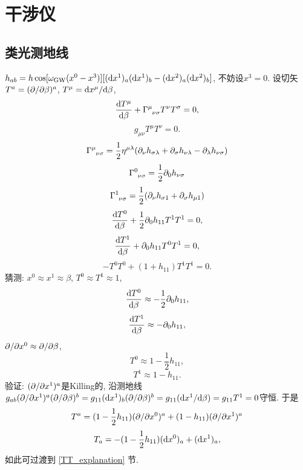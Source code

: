 \chapter{干涉仪}

\section{类光测地线}

$h_{ab}=h\cos[\omega_\text{GW}(x^0-x^3)][(\mathrm{d} x^1)_a(\mathrm{d} x^1)_b-(\mathrm{d} x^2)_a(\mathrm{d} x^2)_b]$, 不妨设$x^3=0$. 设切矢$T^a=(\partial/\partial \beta)^a$, $T^\mu=\mathrm{d} x^\mu/\mathrm{d} \beta$,
\begin{equation}
    \frac{\d T^\mu}{\d \beta}+\Gamma^{\mu}_{\ph{\mu}\nu\sigma}T^\nu T^\sigma=0,
\end{equation}
\begin{equation}
    g_{\mu\nu}T^\mu T^\nu=0.
\end{equation}
\begin{equation}
    \Gamma^{\mu}_{\ph{\mu}\nu\sigma}=\frac{1}{2}\eta^{\mu\lambda}(\p_{\nu}h_{\sigma\lambda}+\p_{\sigma}h_{\nu\lambda}-\p_{\lambda}h_{\nu\sigma})
\end{equation}
\begin{equation}
    \Gamma^{0}_{\ph{0}\nu\sigma}=\frac{1}{2}\p_{0}h_{\nu\sigma}
\end{equation}
\begin{equation}
    \Gamma^{1}_{\ph{1}\nu\sigma}=\frac{1}{2}(\p_{\nu}h_{\sigma1}+\p_{\sigma}h_{\mu1})
\end{equation}
\begin{equation}
    \frac{\mathrm{d} T^0}{\mathrm{d} \beta}+\frac{1}{2}\partial_0h_{11}T^1 T^1=0,
\end{equation}
\begin{equation}
    \frac{\mathrm{d} T^1}{\mathrm{d} \beta}+\partial_0h_{11}T^0 T^1=0,
\end{equation}
\begin{equation}
    -T^0 T^0+(1+h_{11})T^1 T^1=0.
\end{equation}
猜测: $x^0\approx x^1\approx\beta$, $T^0\approx T^1\approx1$,
\begin{equation}
    \frac{\mathrm{d} T^0}{\mathrm{d} \beta}\approx-\frac{1}{2}\partial_0h_{11},
\end{equation}
\begin{equation}
    \frac{\mathrm{d} T^1}{\mathrm{d} \beta}\approx-\partial_0h_{11},
\end{equation}
$\partial/\partial x^0\approx\partial/\partial \beta$,
\begin{equation}
    T^0\approx1-\frac{1}{2}h_{11},
\end{equation}
\begin{equation}
    T^1\approx1-h_{11}.
\end{equation}
验证: $(\partial/\partial x^1)^a$是Killing的, 沿测地线$g_{ab}(\partial/\partial x^1)^a(\partial/\partial\beta)^b=g_{11}(\mathrm{d} x^1)_b(\partial/\partial\beta)^b=g_{11}(\mathrm{d} x^1/\mathrm{d}\beta)=g_{11}T^{1}=0$守恒. 于是
\begin{equation}
    T^a=(1-\frac{1}{2}h_{11})(\partial/\partial x^0)^a+(1-h_{11})(\partial/\partial x^1)^a
\end{equation}
\begin{equation}
    T_a=-(1-\frac{1}{2}h_{11})(\mathrm{d} x^0)_a+(\mathrm{d} x^1)_a,
\end{equation}
如此可过渡到 \ref{TT_explanation} 节.

